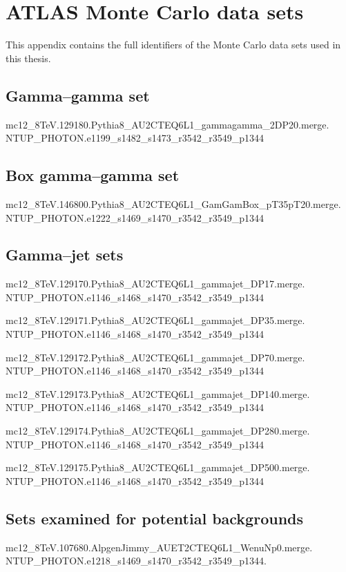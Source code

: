 \appendix

\chapter{ATLAS Monte Carlo data sets}
This appendix contains the full identifiers of the \atlas{} Monte Carlo data sets used in this thesis.

\section{Gamma--gamma set}\label{ax.gg}
mc12\_8TeV.129180.Pythia8\_AU2CTEQ6L1\_gammagamma\_2DP20.merge. \\NTUP\_PHOTON.e1199\_s1482\_s1473\_r3542\_r3549\_p1344

\section{Box gamma--gamma set}\label{ax.ggb}
mc12\_8TeV.146800.Pythia8\_AU2CTEQ6L1\_GamGamBox\_pT35pT20.merge. \\NTUP\_PHOTON.e1222\_s1469\_s1470\_r3542\_r3549\_p1344

\section{Gamma--jet sets}\label{ax.gj}
mc12\_8TeV.129170.Pythia8\_AU2CTEQ6L1\_gammajet\_DP17.merge. \\NTUP\_PHOTON.e1146\_s1468\_s1470\_r3542\_r3549\_p1344

mc12\_8TeV.129171.Pythia8\_AU2CTEQ6L1\_gammajet\_DP35.merge. \\NTUP\_PHOTON.e1146\_s1468\_s1470\_r3542\_r3549\_p1344

mc12\_8TeV.129172.Pythia8\_AU2CTEQ6L1\_gammajet\_DP70.merge. \\NTUP\_PHOTON.e1146\_s1468\_s1470\_r3542\_r3549\_p1344

mc12\_8TeV.129173.Pythia8\_AU2CTEQ6L1\_gammajet\_DP140.merge. \\NTUP\_PHOTON.e1146\_s1468\_s1470\_r3542\_r3549\_p1344

mc12\_8TeV.129174.Pythia8\_AU2CTEQ6L1\_gammajet\_DP280.merge. \\NTUP\_PHOTON.e1146\_s1468\_s1470\_r3542\_r3549\_p1344

mc12\_8TeV.129175.Pythia8\_AU2CTEQ6L1\_gammajet\_DP500.merge. \\NTUP\_PHOTON.e1146\_s1468\_s1470\_r3542\_r3549\_p1344

\section{Sets examined for potential backgrounds}\label{ax.other}
mc12\_8TeV.107680.AlpgenJimmy\_AUET2CTEQ6L1\_WenuNp0.merge. \\NTUP\_PHOTON.e1218\_s1469\_s1470\_r3542\_r3549\_p1344.

